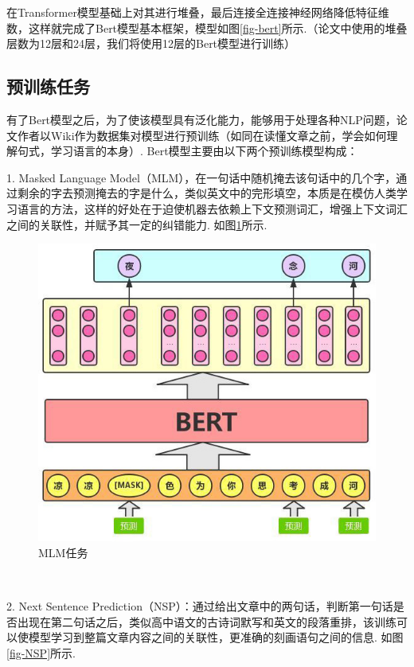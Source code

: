 \documentclass[12pt, a4paper, oneside]{ctexart}
\numberwithin{equation}{section}  %
\begin{document}
{在Transformer模型基础上对其进行堆叠，最后连接全连接神经网络降低特征维数，这样就完成了Bert模型基本框架，模型如图\ref{fig-bert}所示.（论文中使用的堆叠层数为12层和24层，我们将使用12层的Bert模型进行训练）

\subsection{预训练任务}

有了Bert模型之后，为了使该模型具有泛化能力，能够用于处理各种NLP问题，论文作者以Wiki作为数据集对模型进行预训练（如同在读懂文章之前，学会如何理解句式，学习语言的本身）.
Bert模型主要由以下两个预训练模型构成：

1. Masked Language Model（MLM），在一句话中随机掩去该句话中的几个字，通过剩余的字去预测掩去的字是什么，类似英文中的完形填空，本质是在模仿人类学习语言的方法，这样的好处在于迫使机器去依赖上下文预测词汇，增强上下文词汇之间的关联性，并赋予其一定的纠错能力. 如图\ref{fig-MLM}所示.

}
\begin{figure}
\centering
\includegraphics[scale=0.4]{../NLP大作业note.figure/Masked Language Model.jpg}
\caption{MLM任务}
\label{fig-MLM}
\end{figure}
\ \vspace{0.5cm}

2. Next Sentence Prediction（NSP）：通过给出文章中的两句话，判断第一句话是否出现在第二句话之后，类似高中语文的古诗词默写和英文的段落重排，该训练可以使模型学习到整篇文章内容之间的关联性，更准确的刻画语句之间的信息. 如图\ref{fig-NSP}所示.
\end{document}

